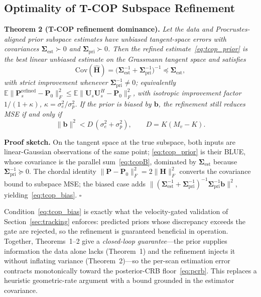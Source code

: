 \documentclass[journal]{IEEEtran}
\newcommand{\mat}[1]{\mathbf{#1}}
\newcommand{\E}{\mathbb{E}}
\begin{document}
\subsection{Optimality of T-COP Subspace Refinement}
\label{sec:tcop_theory}

\textbf{Theorem 2 (T-COP refinement dominance).}
\emph{Let the data and Procrustes-aligned prior subspace estimates have unbiased tangent-space errors with covariances $\mat{\Sigma}_{\mathrm{est}} \succ 0$ and $\mat{\Sigma}_{\mathrm{pri}} \succ 0$. Then the refined estimate~\eqref{eq:tcop_prior} is the best linear unbiased estimate on the Grassmann tangent space and satisfies}
\begin{equation}
\mathrm{Cov}(\hat{\mat{H}}) = \big(\mat{\Sigma}_{\mathrm{est}}^{-1} + \mat{\Sigma}_{\mathrm{pri}}^{-1}\big)^{-1} \preceq \mat{\Sigma}_{\mathrm{est}},
\label{eq:tcopB}
\end{equation}
\emph{with strict improvement whenever $\mat{\Sigma}_{\mathrm{pri}}^{-1} \neq 0$; equivalently $\E\|\mat{P}_s^{\mathrm{refined}} - \mat{P}_0\|_F^2 \le \E\|\mat{U}_s\mat{U}_s^H - \mat{P}_0\|_F^2$, with isotropic improvement factor $1/(1+\kappa)$, $\kappa = \sigma_e^2/\sigma_p^2$. If the prior is biased by $\mat{b}$, the refinement still reduces MSE if and only if}
\begin{equation}
\|\mat{b}\|^2 < D\,(\sigma_e^2 + \sigma_p^2), \qquad D = K(M_v - K).
\label{eq:tcop_bias}
\end{equation}

\textbf{Proof sketch.}
On the tangent space at the true subspace, both inputs are linear-Gaussian observations of the same point; \eqref{eq:tcop_prior} is their BLUE, whose covariance is the parallel sum~\eqref{eq:tcopB}, dominated by $\mat{\Sigma}_{\mathrm{est}}$ because $\mat{\Sigma}_{\mathrm{pri}}^{-1} \succeq 0$. The chordal identity $\|\mat{P} - \mat{P}_0\|_F^2 = 2\|\mat{H}\|_F^2$ converts the covariance bound to subspace MSE; the biased case adds $\|(\mat{\Sigma}_{\mathrm{est}}^{-1} + \mat{\Sigma}_{\mathrm{pri}}^{-1})^{-1}\mat{\Sigma}_{\mathrm{pri}}^{-1}\mat{b}\|^2$, yielding~\eqref{eq:tcop_bias}. \hfill$\square$

Condition~\eqref{eq:tcop_bias} is exactly what the velocity-gated validation of Section~\ref{sec:tracking} enforces: predicted priors whose discrepancy exceeds the gate are rejected, so the refinement is guaranteed beneficial in operation. Together, Theorems~1--2 give a \emph{closed-loop guarantee}---the prior supplies information the data alone lacks (Theorem~1) and the refinement injects it without inflating variance (Theorem~2)---so the per-scan estimation error contracts monotonically toward the posterior-CRB floor~\eqref{eq:pcrb}. This replaces a heuristic geometric-rate argument with a bound grounded in the estimator covariance.
\end{document}
